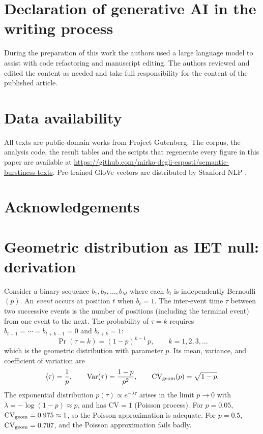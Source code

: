 \documentclass[preprint]{elsarticle}
\newcommand{\meantau}{\langle\tau\rangle}
\newcommand{\CV}{\mathrm{CV}}
\begin{document}
\section*{Declaration of generative AI in the writing process}
During the preparation of this work the authors used a large language
model to assist with code refactoring and manuscript editing. The
authors reviewed and edited the content as needed and take full
responsibility for the content of the published article.
 
\section*{Data availability}
All texts are public-domain works from Project Gutenberg. The corpus,
the analysis code, the result tables and the scripts that regenerate
every figure in this paper are available at
\url{https://github.com/mirko-degli-esposti/semantic-burstiness-texts}.
Pre-trained GloVe vectors are distributed by Stanford NLP
\citep{Pennington2014}.


\section*{Acknowledgements}
\appendix

\section{Geometric distribution as IET null: derivation}
\label{app:geometric}

Consider a binary sequence $b_1, b_2, \ldots, b_M$ where each $b_t$
is independently Bernoulli$(p)$.
An \emph{event} occurs at position $t$ when $b_t = 1$.
The inter-event time $\tau$ between two successive events is the number
of positions (including the terminal event) from one event to the next.
The probability of $\tau = k$ requires $b_{t+1} = \cdots = b_{t+k-1}
= 0$ and $b_{t+k} = 1$:
\begin{equation}
  \Pr(\tau = k) = (1-p)^{k-1}\,p, \qquad k = 1, 2, 3, \ldots
\end{equation}
which is the geometric distribution with parameter $p$.
Its mean, variance, and coefficient of variation are
\begin{equation}
  \meantau = \frac{1}{p},
  \qquad
  \mathrm{Var}(\tau) = \frac{1-p}{p^2},
  \qquad
  \CV_{\rm geom}(p) = \sqrt{1-p}.
\end{equation}
The exponential distribution $p(\tau) \propto e^{-\lambda\tau}$ arises
in the limit $p \to 0$ with $\lambda = -\log(1-p) \approx p$, and has
$\CV = 1$ (Poisson process).
For $p = 0.05$, $\CV_{\rm geom} = 0.975 \approx 1$, so the Poisson
approximation is adequate.
For $p = 0.5$, $\CV_{\rm geom} = 0.707$, and the Poisson
approximation fails badly.
\end{document}
